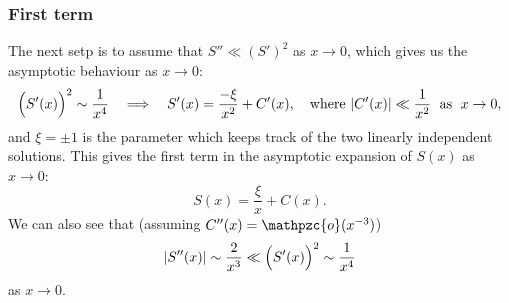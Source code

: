 \documentclass[11pt,letter, swedish, english
]{article}
\newcommand{\oh}{\ensuremath\mathpzc{o}}
\begin{document}
\subsubsection{First term}
The next setp is to assume that $S''\ll(S')^2$ as $x\to0$, which gives
us the asymptotic behaviour as $x\to0$:
\begin{equation}\label{eq:1_S0'}
\Big(S'(x)\Big)^2\sim \frac{1}{x^4}
\quad\Longrightarrow\quad
S'(x)= \frac{-\xi}{x^2} + C'(x)\qcomma\text{where }
|C'(x)|\ll\frac{1}{x^2} \;\text{ as }\; x\to0,
\end{equation}
and $\xi=\pm1$\footnotemark{} is the parameter which keeps track of
the two linearly independent solutions. This gives the first term in
the asymptotic expansion of $S(x)$ as $x\to0$: 
\begin{equation}\label{eq:1_S0}
S(x)=\frac{\xi}{x} + C(x).
\end{equation}
We can also see that (assuming $C''(x)=\oh(x^{-3})$)
\begin{equation}
\abs{S''(x)}\sim\frac{2}{x^3}\ll\Big(S'(x)\Big)^2\sim\frac{1}{x^4}
\end{equation}
as $x\to0$.

\end{document}
